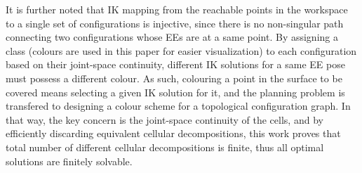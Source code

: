 \documentclass[journal]{IEEEtran}
\begin{document}
It is further noted that IK mapping from the reachable points in the workspace to a single set of configurations is injective, since there is no non-singular path connecting two configurations whose EEs are at a same point. 
By assigning a class (colours are used in this paper for easier visualization) to each configuration based on their joint-space continuity, different IK solutions for a same EE pose must possess a different colour. %
As such, colouring a point in the surface to be covered means selecting a given IK solution for it, 
and the planning problem is transfered to designing a colour scheme for a topological configuration graph.
In that way, the key concern is the joint-space continuity of the cells, and by efficiently discarding equivalent cellular decompositions, this work proves that total number of different cellular decompositions is finite, thus all optimal solutions are finitely solvable. 
\end{document}

